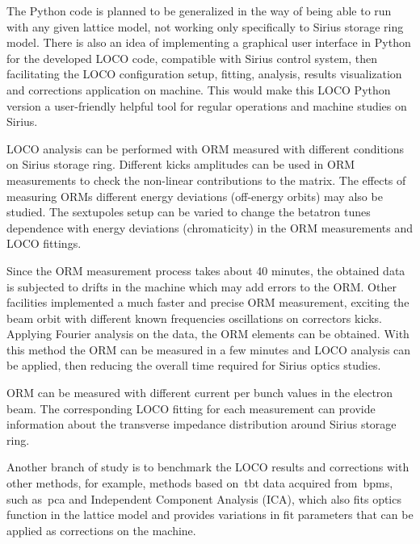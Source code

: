 The Python code is planned to be generalized in the way of being able to run with any given lattice model, not working only specifically to Sirius storage ring model. There is also an idea of implementing a graphical user interface in Python for the developed LOCO code, compatible with Sirius control system, then facilitating the LOCO configuration setup, fitting, analysis, results visualization and corrections application on machine. This would make this LOCO Python version a user-friendly helpful tool for regular operations and machine studies on Sirius. 

LOCO analysis can be performed with ORM measured with different conditions on Sirius storage ring. Different kicks amplitudes can be used in ORM measurements to check the non-linear contributions to the matrix. The effects of measuring ORMs different energy deviations (off-energy orbits) may also be studied. The sextupoles setup can be varied to change the betatron tunes dependence with energy deviations (chromaticity) in the ORM measurements and LOCO fittings.

Since the ORM measurement process takes about 40 minutes, the obtained data is subjected to drifts in the machine which may add errors to the ORM. Other facilities implemented a much faster and precise ORM measurement, exciting the beam orbit with different known frequencies oscillations on correctors kicks. Applying Fourier analysis on the data, the ORM elements can be obtained. With this method the ORM can be measured in a few minutes and LOCO analysis can be applied, then reducing the overall time required for Sirius optics studies.

ORM can be measured with different current per bunch values in the electron beam. The corresponding LOCO fitting for each measurement can provide information about the transverse impedance distribution around Sirius storage ring.  

Another branch of study is to benchmark the LOCO results and corrections with other methods, for example, methods based on~\gls{tbt} data acquired from~\glspl{bpm}, such as~\gls{pca} and Independent Component Analysis (ICA), which also fits optics function in the lattice model and provides variations in fit parameters that can be applied as corrections on the machine.
